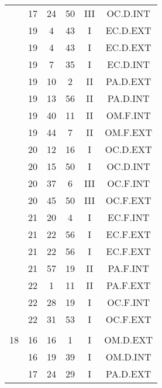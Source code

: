 \documentclass[12pt, a4paper]{article}
\begin{document}
\begin{multicols}{3}
{\begin{tabular}{c c c c c c}
	 	 	 	 & 17 & 24 & 50 & III & OC.D.INT\\%
	 	 	 	 & 19 & 4 & 43 & I & EC.D.EXT\\%
	 	 	 	 & 19 & 4 & 43 & I & EC.D.EXT\\%
	 	 	 	 & 19 & 7 & 35 & I & EC.D.INT\\%
	 	 	 	 & 19 & 10 & 2 & II & PA.D.EXT\\%
	 	 	 	 & 19 & 13 & 56 & II & PA.D.INT\\%
	 	 	 	 & 19 & 40 & 11 & II & OM.F.INT\\%
	 	 	 	 & 19 & 44 & 7 & II & OM.F.EXT\\%
	 	 	 	 & 20 & 12 & 16 & I & OC.D.EXT\\%
	 	 	 	 & 20 & 15 & 50 & I & OC.D.INT\\%
	 	 	 	 & 20 & 37 & 6 & III & OC.F.INT\\%
	 	 	 	 & 20 & 45 & 50 & III & OC.F.EXT\\%
	 	 	 	 & 21 & 20 & 4 & I & EC.F.INT\\%
	 	 	 	 & 21 & 22 & 56 & I & EC.F.EXT\\%
	 	 	 	 & 21 & 22 & 56 & I & EC.F.EXT\\%
	 	 	 	 & 21 & 57 & 19 & II & PA.F.INT\\%
	 	 	 	 & 22 & 1 & 11 & II & PA.F.EXT\\%
	 	 	 	 & 22 & 28 & 19 & I & OC.F.INT\\%
	 	 	 	 & 22 & 31 & 53 & I & OC.F.EXT\\%
	 	 	 	 & & & & & \\%
	 	 	 	18 & 16 & 16 & 1 & I & OM.D.EXT\\%
	 	 	 	 & 16 & 19 & 39 & I & OM.D.INT\\%
	 	 	 	 & 17 & 24 & 29 & I & PA.D.EXT\\%

\end{tabular}}
\end{multicols}
\end{document}

